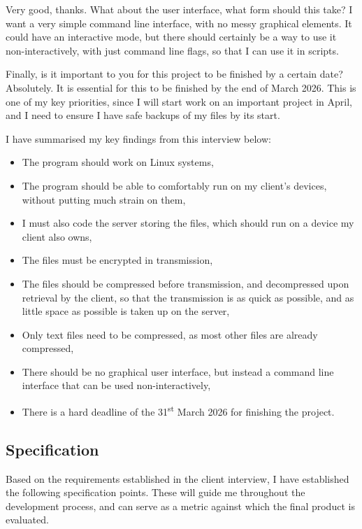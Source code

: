 \documentclass[../main.tex]{subfiles}
\begin{document}
\begin{qanda}
\Q Very good, thanks. What about the user interface, what form should this take? 
\A I want a very simple command line interface, with no messy graphical elements. It could have an interactive mode, but there should certainly be a way to use it non-interactively, with just command line flags, so that I can use it in scripts. 

\Q Finally, is it important to you for this project to be finished by a certain date? 
\A Absolutely. It is essential for this to be finished by the end of March 2026. This is one of my key priorities, since I will start work on an important project in April, and I need to ensure I have safe backups of my files by its start.

\end{qanda}

I have summarised my key findings from this interview below:
\begin{itemize}
    \item The program should work on Linux systems,
    \item The program should be able to comfortably run on my client's devices, without putting much strain on them,
    \item I must also code the server storing the files, which should run on a device my client also owns,
    \item The files must be encrypted in transmission,
    \item The files should be compressed before transmission, and decompressed upon retrieval by the client, so that the transmission is as quick as possible, and as little space as possible is taken up on the server,
    \item Only text files need to be compressed, as most other files are already compressed,
    \item There should be no graphical user interface, but instead a command line interface that can be used non-interactively,
    \item There is a hard deadline of the 31\textsuperscript{st} March 2026 for finishing the project.
\end{itemize}

\subsection{Specification}

Based on the requirements established in the client interview, I have established the following specification points. These will guide me throughout the development process, and can serve as a metric against which the final product is evaluated.
\end{document}

